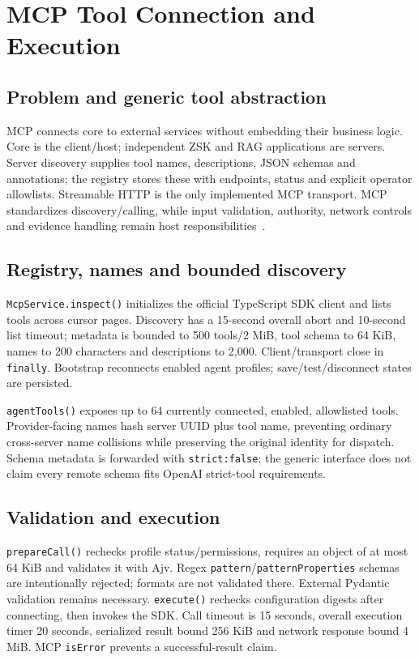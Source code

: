 \chapter{MCP Tool Connection and Execution}
\section{Problem and generic tool abstraction}
MCP connects core to external services without embedding their business logic. Core is the client/host; independent ZSK and RAG applications are servers. Server discovery supplies tool names, descriptions, JSON schemas and annotations; the registry stores these with endpoints, status and explicit operator allowlists. Streamable HTTP is the only implemented MCP transport. MCP standardizes discovery/calling, while input validation, authority, network controls and evidence handling remain host responsibilities~\cite{mcp}.
\section{Registry, names and bounded discovery}
\texttt{McpService.inspect()} initializes the official TypeScript SDK client and lists tools across cursor pages. Discovery has a 15-second overall abort and 10-second list timeout; metadata is bounded to 500 tools/2 MiB, tool schema to 64 KiB, names to 200 characters and descriptions to 2,000. Client/transport close in \texttt{finally}. Bootstrap reconnects enabled agent profiles; save/test/disconnect states are persisted.

\texttt{agentTools()} exposes up to 64 currently connected, enabled, allowlisted tools. Provider-facing names hash server UUID plus tool name, preventing ordinary cross-server name collisions while preserving the original identity for dispatch. Schema metadata is forwarded with \texttt{strict:false}; the generic interface does not claim every remote schema fits OpenAI strict-tool requirements.
\section{Validation and execution}
\texttt{prepareCall()} rechecks profile status/permissions, requires an object of at most 64 KiB and validates it with Ajv. Regex \texttt{pattern}/\texttt{patternProperties} schemas are intentionally rejected; formats are not validated there. External Pydantic validation remains necessary. \texttt{execute()} rechecks configuration digests after connecting, then invokes the SDK. Call timeout is 15 seconds, overall execution timer 20 seconds, serialized result bound 256 KiB and network response bound 4 MiB. MCP \texttt{isError} prevents a successful-result claim.
